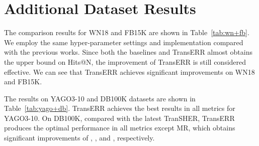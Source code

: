 \documentclass[11pt]{article}
\begin{document}
\section{Additional Dataset Results}\label{app-d}


The comparison results for WN18 and FB15K are shown in Table~\ref{tab:wn+fb}. We employ the same hyper-parameter settings and implementation compared with the previous works.  Since both the baselines and TransERR almost obtains the upper bound on Hits@N, the improvement of TransERR is still considered effective. We can see that TransERR achieves significant improvements on WN18 and FB15K.


The results on YAGO3-10 and DB100K datasets are shown in Table~\ref{tab:yago+db}. TransERR achieves the best results in all metrics for YAGO3-10. On DB100K, compared with the latest TranSHER, TransERR produces the optimal performance in all metrics except MR, which obtains significant improvements of , ,  and , respectively.
\end{document}
